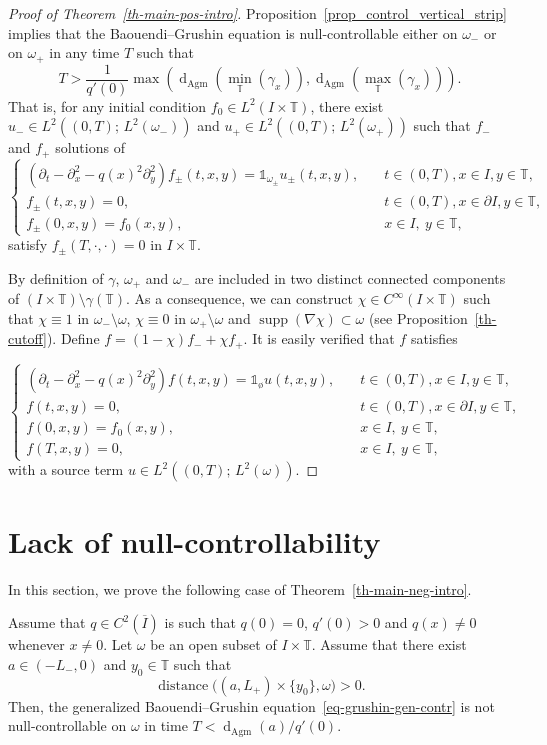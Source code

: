 \documentclass[AHL,Unicode,longabstracts,published]{cedram}
\newcommand{\1}{\mathds 1}
\DeclareMathOperator{\distance}{distance}
\DeclareMathOperator{\supp}{supp}
\newcommand{\dagmon}{\mathop{\mathrm{d}}\nolimits_{\mathrm{Agm}}}
\newcommand{\T}{\mathbb{T}}
\renewcommand{\o}{\omega}
\renewcommand{\o}{\omega}
\begin{document}
\begin{proof}[Proof of Theorem~\ref{th-main-pos-intro}]
Proposition~\ref{prop_control_vertical_strip} implies that the Baouendi--Grushin equation is null-controllable either on $\o_-$ or on $\o_+$ in any time $T$ such that
\[
T> \frac 1 {q'(0)} \max\left(\dagmon\left(\min_\T(\gamma_x)\right), \dagmon\left(\max_\T (\gamma_x)\right) \right).
\]
That is, for any initial condition $f_0 \in L^2(I\times \T)$, there exist $u_-\in L^2((0,T);\, L^2(\o_-))$ and $u_+\in L^2((0,T);\, L^2(\o_+))$ such that $f_-$ and $f_+$ solutions of
\[
\left\{
\begin{array}{ll}
\left(\partial_t-\partial_x^2 - q(x)^2 \partial_y^2\right)f_\pm(t,x,y) = \mathds 1_{\o_\pm} u_\pm(t,x,y),&\quad t\in (0,T), x\in I, y\in \T,\\
f_\pm(t,x,y) = 0,&\quad t\in (0,T), x\in\partial I, y\in \T, \\
f_\pm(0,x,y) = f_0(x,y), & \quad x \in I, \ y \in \T,
\end{array}\right.
\]
satisfy $f_\pm(T,\cdot,\cdot) = 0$ in $I\times \T$.

By definition of $\gamma$, $\omega_+$ and $\omega_-$ are included in two distinct connected components of $(I \times \T) \setminus \gamma(\T)$. As a consequence, we can construct $\chi \in C^\infty(I\times \T)$ such that $\chi \equiv 1$ in $\omega_-\setminus \omega$, $\chi \equiv 0$ in $\omega_+\setminus \omega$ and $\supp(\nabla \chi) \subset \o$ (see Proposition~\ref{th-cutoff}). Define $ f = (1-\chi) f_- + \chi f_+$. It is easily verified that $f$ satisfies

\[
\left\{
\begin{array}{ll}
\left(\partial_t-\partial_x^2 - q(x)^2 \partial_y^2\right)f(t,x,y) = \mathds 1_{\text{ø}} u(t,x,y), &\quad t\in (0,T), x\in I, y\in \T,\\
f(t,x,y) = 0,&\quad t\in (0,T), x\in\partial I, y\in \T, \\
f(0,x,y) = f_0(x,y), & \quad x \in I, \ y \in \T, \\
f(T,x,y) = 0, & \quad x \in I, \ y \in \T,
\end{array}\right.
\]
with a source term $u \in L^2((0,T);\, L^2(\o))$.
\end{proof}

\section{Lack of null-controllability}\label{sec_negative_result}
In this section, we prove the following case of Theorem~\ref{th-main-neg-intro}.

\begin{theo}\label{th-main-neg}
Assume that $q\in C^2(\overline I)$ is such that $q(0) = 0$, $q'(0) > 0$ and $q(x) \neq 0$ whenever $x\neq 0$. Let $\o$ be an open subset of $I\times \T$. Assume that there exist $a \in (-L_-,0)$ and $y_0 \in \T$ such that
\[
\distance\big((a,L_+)\times \{y_0\}, \o\big) > 0.
\]
Then, the generalized Baouendi--Grushin equation~\eqref{eq-grushin-gen-contr} is not null-controllable on $\o$ in time $T< \dagmon(a)/q'(0)$.
\end{theo}
\end{document}
